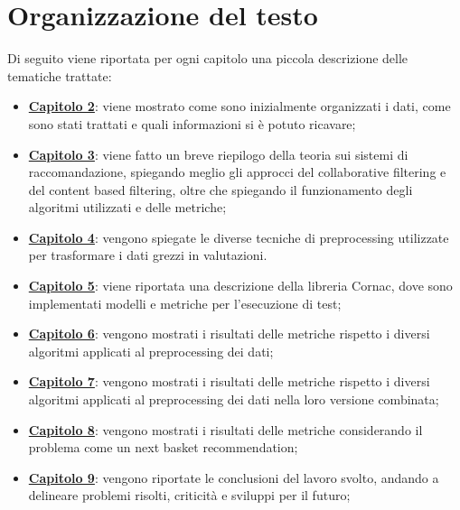 \section{Organizzazione del testo}
Di seguito viene riportata per ogni capitolo una piccola descrizione delle tematiche trattate:
\begin{itemize}
	\item \hyperlink{(chap:capitolo3)}{\textbf{Capitolo 2}}: viene mostrato come sono inizialmente organizzati i dati, come sono stati trattati e quali informazioni si è potuto ricavare;
	\item \hyperlink{(chap:capitolo4)}{\textbf{Capitolo 3}}: viene fatto un breve riepilogo della teoria sui sistemi di raccomandazione, spiegando meglio gli approcci del collaborative filtering e del content based filtering, oltre che spiegando il funzionamento degli algoritmi utilizzati e delle metriche;
	\item \hyperlink{(chap:capitolo5)}{\textbf{Capitolo 4}}: vengono spiegate le diverse tecniche di preprocessing utilizzate per trasformare i dati grezzi in valutazioni.
	\item \hyperlink{(chap:capitolo6)}{\textbf{Capitolo 5}}: viene riportata una descrizione della libreria Cornac, dove sono implementati modelli e metriche per l'esecuzione di test;
	\item \hyperlink{(chap:capitolo7)}{\textbf{Capitolo 6}}: vengono mostrati i risultati delle metriche rispetto i diversi algoritmi applicati al preprocessing dei dati;
	\item \hyperlink{(chap:capitolo8)}{\textbf{Capitolo 7}}: vengono mostrati i risultati delle metriche rispetto i diversi algoritmi applicati al preprocessing dei dati nella loro versione combinata;
	\item \hyperlink{(chap:capitolo9)}{\textbf{Capitolo 8}}: vengono mostrati i risultati delle metriche considerando il problema come un next basket recommendation;
	\item \hyperlink{(chap:capitolo10)}{\textbf{Capitolo 9}}: vengono riportate le conclusioni del lavoro svolto, andando a delineare problemi risolti, criticità e sviluppi per il futuro;
\end{itemize}

